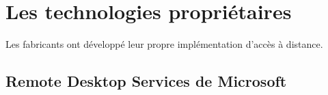 \section{Les technologies propriétaires}
Les fabricants ont développé leur propre implémentation d'accès à distance.
\subsection{Remote Desktop Services de Microsoft}
